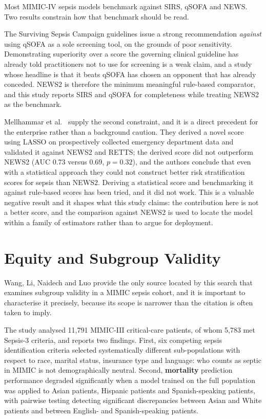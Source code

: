 Most MIMIC-IV sepsis models benchmark against SIRS, qSOFA and NEWS. Two results
constrain how that benchmark should be read.

The Surviving Sepsis Campaign guidelines \cite{evans2021ssc} issue a strong
recommendation \emph{against} using qSOFA as a sole screening tool, on the
grounds of poor sensitivity. Demonstrating superiority over a score the
governing clinical guideline has already told practitioners not to use for
screening is a weak claim, and a study whose headline is that it beats qSOFA
has chosen an opponent that has already conceded. NEWS2 is therefore the minimum
meaningful rule-based comparator, and this study reports SIRS and qSOFA for
completeness while treating NEWS2 as the benchmark.

Mellhammar et al.\ \cite{mellhammar2020news2} supply the second constraint, and
it is a direct precedent for the enterprise rather than a background caution.
They derived a novel score using LASSO on prospectively collected emergency
department data and validated it against NEWS2 and RETTS; the derived score did
not outperform NEWS2 (AUC 0.73 versus 0.69, $p = 0.32$), and the authors
conclude that even with a statistical approach they could not construct better
risk stratification scores for sepsis than NEWS2. Deriving a statistical score
and benchmarking it against rule-based scores has been tried, and it did not
work. This is a valuable negative result and it shapes what this study claims:
the contribution here is not a better score, and the comparison against NEWS2 is
used to locate the model within a family of estimators rather than to argue for
deployment.


\section{Equity and Subgroup Validity}
\label{sec:equity_lit}

Wang, Li, Naidech and Luo \cite{wang2022equity} provide the only source located
by this search that examines subgroup validity in a MIMIC sepsis cohort, and it
is important to characterise it precisely, because its scope is narrower than
the citation is often taken to imply.

The study \cite{wang2022equity} analysed 11,791 MIMIC-III critical-care
patients, of whom 5,783 met Sepsis-3 criteria, and reports two findings. First, six competing sepsis
identification criteria selected systematically different sub-populations with
respect to race, marital status, insurance type and language: who counts as
septic in MIMIC is not demographically neutral. Second, \textbf{mortality}
prediction performance degraded significantly when a model trained on the full
population was applied to Asian patients, Hispanic patients and
Spanish-speaking patients, with pairwise testing detecting significant
discrepancies between Asian and White patients and between English- and
Spanish-speaking patients.

